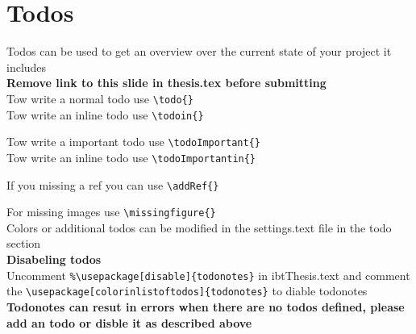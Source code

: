 \chapter*{Todos}
Todos can be used to get an overview over the current state of your project it includes \\

\textbf{Remove link to this slide in thesis.tex before submitting}\\

Tow write a normal todo use \verb|\todo{}|
\\

Tow write an inline todo use \verb|\todoin{}|\\

Tow write a important todo use \verb|\todoImportant{}|
\\

Tow write an inline todo use \verb|\todoImportantin{}|\\

If you missing a ref you can use \verb|\addRef{}|\\
\addRef

For missing images use \verb|\missingfigure{}|\\
Colors or additional todos can be modified in the settings.text file in the todo section\\
\textbf{Disabeling todos}\\
Uncomment \verb|%\usepackage[disable]{todonotes}| in ibtThesis.text and comment the \verb|\usepackage[colorinlistoftodos]{todonotes}| to diable todonotes\\
\textbf{Todonotes can resut in errors when there are no todos defined, please add an todo or disble it as described above}

